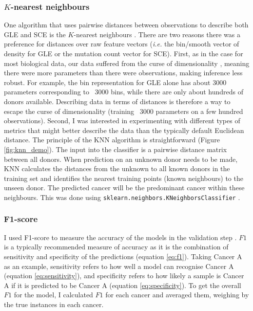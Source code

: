 \subsubsection{$K$-nearest neighbours}
One algorithm that uses pairwise distances between observations to describe both GLE and SCE is the $K$-nearest neighbours \citep[KNN;][]{Neath2010DiscriminationClassification}. There are two reasons there was a preference for distances over raw feature vectors (\textit{i.e.} the bin/smooth vector of density for GLE or the mutation count vector for SCE). First, as in the case for most biological data, our data suffered from the curse of dimensionality \citep{Banks2003DataStatistics}, meaning there were more parameters than there were observations, making inference less robust. For example, the bin representation for GLE alone has about 3000 parameters corresponding to ~3000 bins, while there are only about hundreds of donors available. Describing data in terms of distances is therefore a way to escape the curse of dimensionality (training ~3000 parameters on a few hundred observations). Second, I was interested in experimenting with different types of metrics that might better describe the data than the typically default Euclidean distance. The principle of the KNN algorithm is straightforward (Figure \ref{fig:knn_demo}). The input into the classifier is a pairwise distance matrix between all donors. When prediction on an unknown donor needs to be made, KNN calculates the distances from the unknown to all known donors in the training set and identifies the nearest training points (known neighbours) to the unseen donor. The predicted cancer will be the predominant cancer within these neighbours. This was done using \texttt{sklearn.neighbors.KNeighborsClassifier} \citep{scikit-learn}.



\newpage
\subsubsection{F1-score}
I used F1-score to measure the accuracy of the models in the validation step \citep{Kulkarni2020FoundationsDemocracy}. $F1$ is a typically recommended measure of accuracy as it is the combination of sensitivity and specificity of the predictions (equation \ref{eq:f1}). Taking Cancer A as an example, sensitivity refers to how well a model can recognise Cancer A (equation \ref{eq:sensitivity}), and specificity refers to how likely a sample is Cancer A if it is predicted to be Cancer A (equation \ref{eq:specificity}). To get the overall $F1$ for the model, I calculated $F1$ for each cancer and averaged them, weighing by the true instances in each cancer.


